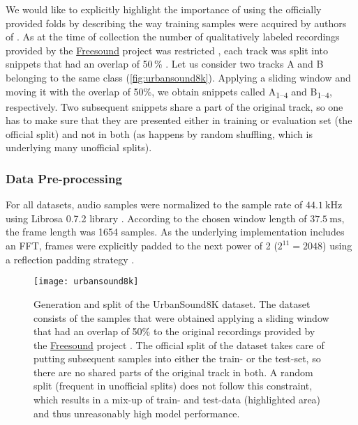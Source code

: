 \documentclass[a4paper,conference]{IEEEtran}
\begin{document}
We would like to explicitly highlight the importance of using the officially provided folds by describing the way training samples were acquired by authors of \cite{salamon2014us8k}.
As at the time of collection the number of qualitatively labeled recordings provided by the \href{https://freesound.org/}{Freesound} project \cite{freesound2013} was restricted \cite{salamon2014us8k}, each track was split into snippets that had an overlap of 50\,\% \cite{salamon2014us8k}.
Let us consider two tracks A and B belonging to the same class (\autoref{fig:urbansound8k}).
Applying a sliding window and moving it with the overlap of 50\:\%, we obtain snippets called A\textsubscript{1--4} and B\textsubscript{1--4}, respectively.
Two subsequent snippets share a part of the original track, so one has to make sure that they are presented either in training or evaluation set (the official split) and not in both (as happens by random shuffling, which is underlying many unofficial splits).

\subsubsection{Data Pre-processing}
For all datasets, audio samples were normalized to the sample rate of $44.1\:\si{\kilo\hertz}$ using Librosa 0.7.2 library \cite{librosa2020}.
According to the chosen window length of $37.5\:\si{\milli\second}$, the frame length was 1654 samples.
As the underlying implementation includes an FFT, frames were explicitly padded to the next power of 2 ($2^{11}=2048$) using a reflection padding strategy \cite{cooley1965fft}.

\begin{figure}[!hbt]
\centering
\texttt{[image: urbansound8k]}
\caption{Generation and split of the UrbanSound8K dataset. The dataset consists of the samples that were obtained applying a sliding window that had an overlap of 50\:\% to the original recordings provided by the \href{https://freesound.org/}{Freesound} project \cite{freesound2013}.
The official split of the dataset takes care of putting subsequent samples into either the train- or the test-set, so there are no shared parts of the original track in both.
A random split (frequent in unofficial splits) does not follow this constraint, which results in a mix-up of train- and test-data (highlighted area) and thus unreasonably high model performance.}
\label{fig:urbansound8k}
\end{figure}
\end{document}
